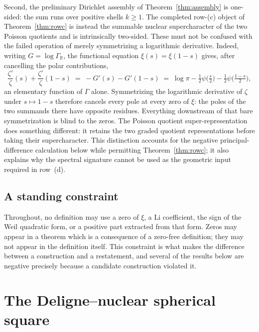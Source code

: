 \documentclass[11pt]{amsart}
\theoremstyle{definition}
\theoremstyle{remark}
\begin{document}
Second, the preliminary Dirichlet assembly of
Theorem~\ref{thm:assembly} is one-sided: the sum runs over positive shells
$k\ge1$.  The completed row-(c) object of Theorem~\ref{thm:rowc} is instead
the summable nuclear supercharacter of the two Poisson quotients and is
intrinsically two-sided.  These
must not be confused with the failed operation of merely symmetrizing a
logarithmic derivative.  Indeed, writing
$G=\log\Gamma_{\mathbb R}$, the functional equation
$\xi(s)=\xi(1-s)$ gives, after cancelling the polar contributions,
\begin{equation}
\label{eq:collapse}
 \frac{\zeta'}{\zeta}(s)+\frac{\zeta'}{\zeta}(1-s)
 \;=\;-G'(s)-G'(1-s)
 \;=\;\log\pi-\tfrac12\psi\!\big(\tfrac s2\big)
 -\tfrac12\psi\!\big(\tfrac{1-s}2\big),
\end{equation}
an elementary function of $\Gamma$ alone.  Symmetrizing the logarithmic
derivative of $\zeta$ under $s\mapsto1-s$ therefore cancels every pole at
every zero of $\xi$: the poles of the two summands there have opposite
residues.  Everything downstream of that bare symmetrization is blind to the
zeros.  The Poisson quotient super-representation does something different:
it retains the two graded quotient representations before taking their
supercharacter.  This distinction
accounts for the negative principal-difference calculation below while permitting
Theorem~\ref{thm:rowc}; it also explains why the spectral signature cannot be
used as the geometric input required in row~(d).

\subsection{A standing constraint}
\label{ss:constraint}

Throughout, no definition may use a zero of $\xi$, a Li coefficient, the
sign of the Weil quadratic form, or a positive part extracted from that
form.  Zeros may appear in a theorem which is a consequence of a zero-free
definition; they may not appear in the definition itself.  This constraint
is what makes the difference between a construction and a restatement, and
several of the results below are negative precisely because a candidate
construction violated it.


\section{The Deligne--nuclear spherical square}
\label{sec:geometric-a}
\end{document}
